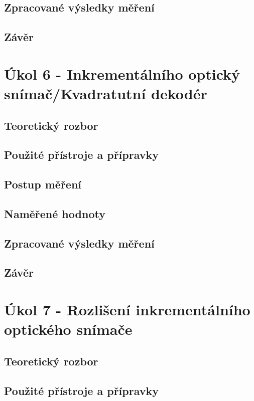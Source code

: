 \documentclass{protokol}
\begin{document}
    \subsection{Zpracované výsledky měření}
    \subsection{Závěr}

\pagebreak


\section{Úkol 6 - Inkrementálního optický snímač/Kvadratutní dekodér}
    \subsection{Teoretický rozbor}
    \subsection{Použité přístroje a přípravky}
    \subsection{Postup měření}
    \subsection{Naměřené hodnoty}
    \subsection{Zpracované výsledky měření}
    \subsection{Závěr}

\pagebreak


\section{Úkol 7 - Rozlišení inkrementálního optického snímače}
    \subsection{Teoretický rozbor}
    \subsection{Použité přístroje a přípravky}
\end{document}
